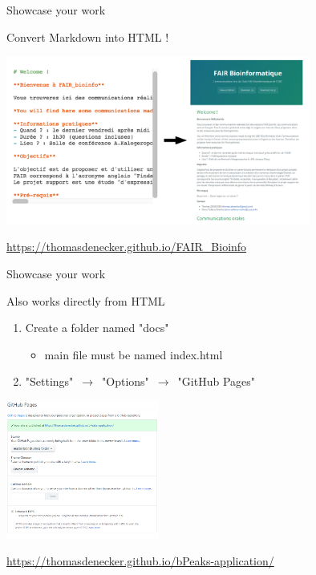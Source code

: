 \begin{frame}{Showcase your work}

Convert Markdown into HTML !

\begin{center}
    \includegraphics[width=10cm]{08_sharing/images/convert_html.png}
\end{center}

\begin{center}
\url{https://thomasdenecker.github.io/FAIR_Bioinfo}
\end{center}

\end{frame}

\begin{frame}{Showcase your work}

Also works directly from HTML 

\begin{enumerate}
    \item Create a folder named "docs"
    \begin{itemize}
        \item main file must be named index.html
    \end{itemize}
    \item "Settings" $\,\to\,$ "Options" $\,\to\,$ "GitHub Pages"
\end{enumerate}

\begin{center}
    \includegraphics[width=5cm]{08_sharing/images/github_pages_settings_html.png}
\end{center}

\begin{center}
\url{https://thomasdenecker.github.io/bPeaks-application/}
\end{center}

\end{frame}

